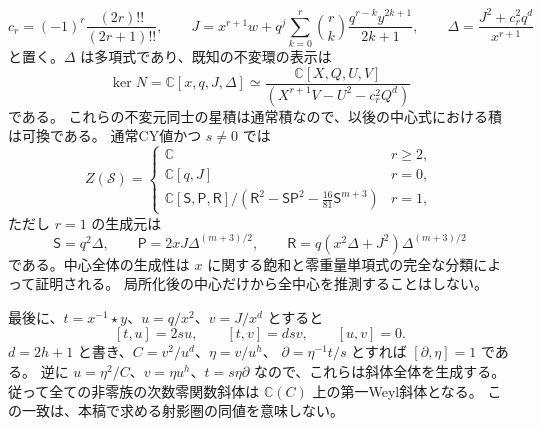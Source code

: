 \[
 c_r=(-1)^r\frac{(2r)!!}{(2r+1)!!},\qquad
 J=x^{r+1}w+q^j\sum_{k=0}^r\binom rk\frac{q^{r-k}y^{2k+1}}{2k+1},\qquad
 \Delta=\frac{J^2+c_r^2q^d}{x^{r+1}}
\]
と置く。$\Delta$ は多項式であり、既知の不変環の表示は
\[
 \ker N=\mathbb C[x,q,J,\Delta]
 \simeq\frac{\mathbb C[X,Q,U,V]}{(X^{r+1}V-U^2-c_r^2Q^d)}
\]
である\cite[非線形アフィン族の多項式中心]{VKPoisson34}。
これらの不変元同士の星積は通常積なので、以後の中心式における積は可換である。
通常CY値かつ $s\ne0$ では
\[
 Z(\mathcal S)=
 \begin{cases}
 \mathbb C&r\ge2,\\
 \mathbb C[q,J]&r=0,\\
 \mathbb C[\mathsf S,\mathsf P,\mathsf R]/
  (\mathsf R^2-\mathsf S\mathsf P^2-\frac{16}{81}\mathsf S^{m+3})&r=1,
 \end{cases}
\]
ただし $r=1$ の生成元は
\[
 \mathsf S=q^2\Delta,\qquad
 \mathsf P=2xJ\Delta^{(m+3)/2},\qquad
 \mathsf R=q(x^2\Delta+J^2)\Delta^{(m+3)/2}
\]
である。中心全体の生成性は $x$ に関する飽和と零重量単項式の完全な分類によって証明される。
局所化後の中心だけから全中心を推測することはしない。

最後に、$t=x^{-1}\star y$、$u=q/x^2$、$v=J/x^d$ とすると
\[
 [t,u]=2su,\qquad [t,v]=dsv,\qquad [u,v]=0.
\]
$d=2h+1$ と書き、$C=v^2/u^d$、$\eta=v/u^h$、
$\partial=\eta^{-1}t/s$ とすれば $[\partial,\eta]=1$ である。
逆に $u=\eta^2/C$、$v=\eta u^h$、$t=s\eta\partial$ なので、これらは斜体全体を生成する。
従って全ての非零族の次数零関数斜体は $\mathbb C(C)$ 上の第一Weyl斜体となる。
この一致は、本稿で求める射影圏の同値を意味しない。
